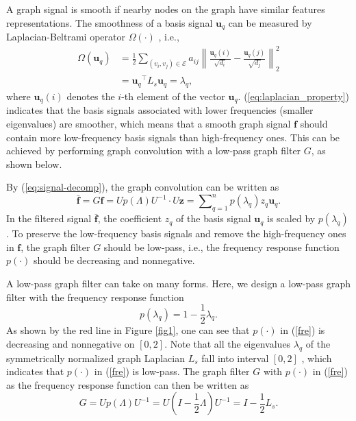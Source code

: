 \documentclass{article}
\begin{document}
A graph signal is smooth if nearby nodes on the graph have similar features representations. The smoothness of a basis signal $\bm u_q$ can be measured by Laplacian-Beltrami operator $\Omega(\cdot)$ \cite{Chung97}, i.e.,
\begin{equation} \label{eq:laplacian_property}
\begin{split}
\Omega(\bm u_q)
&=\frac12\sum_{(v_i,v_j)\in \mathcal{E}}{a_{ij}\left\|\frac{\bm u_q(i)}{\sqrt{d_{i}}}-\frac{\bm u_q(j)}{\sqrt{d_{j}}}\right\|_2^2}\\
&= {\bm u_q}^\top L_s{\bm u_q} =\lambda_q,
\end{split}
\end{equation}
where $\bm u_q(i)$ denotes the $i$-th element of the vector $\bm u_q$. (\ref{eq:laplacian_property}) indicates that the basis signals associated with lower frequencies (smaller eigenvalues) are smoother, which means that a smooth graph signal $\bm f$ should contain more low-frequency basis signals than high-frequency ones. This can be achieved by performing graph convolution with a low-pass graph filter $G$, as shown below.

By (\ref{eq:signal-decomp}), the graph convolution can be written as
\begin{equation}\label{eq:filter_decom}
\bar{\bm f}= G\bm f =U p(\Lambda) U^{-1} \cdot U \bm z=\sum\nolimits_{q=1}^n{p(\lambda_q)z_q \bm u_q}.
\end{equation}
In the filtered signal $\bar{\bm f}$, the coefficient $z_q$ of the basis signal $\bm u_q$ is scaled by $p(\lambda_q)$. To preserve the low-frequency basis signals and remove the high-frequency ones in $\bm f$, the graph filter $G$ should be low-pass, i.e., the frequency response function $p(\cdot)$ should be decreasing and nonnegative.



A low-pass graph filter can take on many forms. Here, we design a low-pass graph filter with the frequency response function
\begin{equation}\label{fre}
p(\lambda_q)=1-\frac12\lambda_q.
\end{equation}
As shown by the red line in Figure \ref{fig1}, one can see that $p(\cdot)$ in (\ref{fre}) is decreasing and nonnegative on $[0,2]$. Note that all the eigenvalues $\lambda_q$ of the symmetrically normalized graph Laplacian $L_s$ fall into interval $[0,2]$ \cite{Chung97}, which indicates that $p(\cdot)$ in (\ref{fre}) is low-pass. The graph filter $G$ with $p(\cdot)$ in (\ref{fre}) as the frequency response function can then be written as
\begin{equation}\label{fil}
G=U p(\Lambda)U^{-1}=U(I-\frac12\Lambda)U^{-1}=I-\frac12 L_s.
\end{equation}
\end{document}
